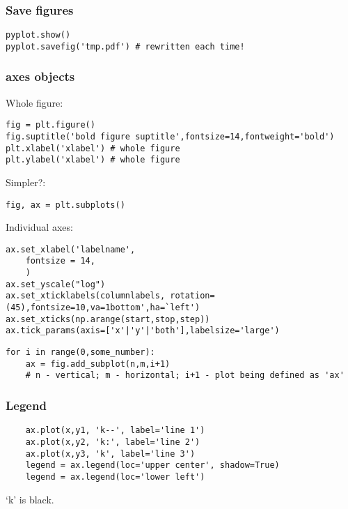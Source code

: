 \documentclass{article}
\begin{document}
\subsubsection{Save figures}
\begin{verbatim}
pyplot.show()
pyplot.savefig('tmp.pdf') # rewritten each time!
\end{verbatim}

\subsubsection{axes objects}
Whole figure:
\begin{verbatim}
fig = plt.figure()
fig.suptitle('bold figure suptitle',fontsize=14,fontweight='bold')
plt.xlabel('xlabel') # whole figure
plt.ylabel('xlabel') # whole figure
\end{verbatim}

Simpler?:
\begin{verbatim}
fig, ax = plt.subplots()
\end{verbatim}

Individual axes:
\begin{verbatim}
ax.set_xlabel('labelname',
    fontsize = 14,
    )
ax.set_yscale("log")
ax.set_xticklabels(columnlabels, rotation=(45),fontsize=10,va=1bottom',ha=`left')
ax.set_xticks(np.arange(start,stop,step))
ax.tick_params(axis=['x'|'y'|'both'],labelsize='large')
\end{verbatim}

\begin{verbatim}
for i in range(0,some_number):
    ax = fig.add_subplot(n,m,i+1)
    # n - vertical; m - horizontal; i+1 - plot being defined as 'ax'
\end{verbatim}

\subsubsection{Legend}
\begin{verbatim}
    ax.plot(x,y1, 'k--', label='line 1')
    ax.plot(x,y2, 'k:', label='line 2')
    ax.plot(x,y3, 'k', label='line 3')
    legend = ax.legend(loc='upper center', shadow=True)
    legend = ax.legend(loc='lower left')
\end{verbatim}
`k' is black.
\end{document}
